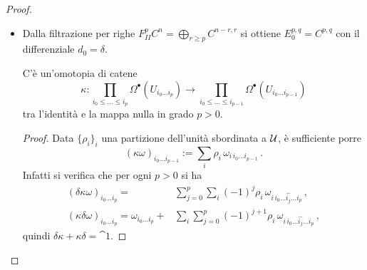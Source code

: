 \begin{ex!}
\begin{thm}
\begin{proof}
\begin{itemize}
\begin{equation*}
				= \prod_{i_{0} \le \dots \le i_{p}} H_{\mathrm{dR}}^{q}(U_{i_{0} \dots i_{p}})
				= \begin{cases}
					\R\,, \quad &\text{se } q = 0\,; \\
					0\,, \quad &\text{altrimenti},
				\end{cases}
				\end{equation*}
				dove l'ultima uguaglianza segue dall'ipotesi di $\Uu$ buon ricoprimento.
				Si noti in particolare che
				\begin{equation*}
					H^{0}_{\mathrm{dR}}(U_{i_{0} \dots i_{p}}) 
					= \R
					= \underline{\R}(U_{i_{0} \dots i_{p}})
				\end{equation*}
				è dotato del differenziale  $d_{1}=\delta$. Dato che la successione
				collassa alla seconda pagina, 
				il limite è $E_{\infty}^{p,q} = E_{2}^{p,q}$,
				quindi si conclude che
				\begin{equation*}
				 	H^{*}(T^{bullet}) = \check{H}^{*}(M;\Uu)\,.
				 \end{equation*}
				
				\item Dalla filtrazione per righe 
				$F_{II}^{p}C^{n}=\bigoplus_{r \ge p} C^{n-r,r}$
				si ottiene $E_{0}^{p,q} = C^{p,q}$ con il differenziale $d_{0}=\delta$.
				
				\begin{lemma}
					C'è un'omotopia di catene
					\begin{equation*}
						\kappa : \prod_{i_{0} \le \dots \le i_{p}} \Omega^{\bullet} (U_{i_{0} \dots i_{p}})
						\longrightarrow \prod_{i_{0} \le \dots \le i_{p-1}} \Omega^{\bullet} (U_{i_{0} \dots i_{p-1}})
					\end{equation*}
					tra l'identità e la mappa nulla in grado $p > 0$.
					\begin{proof}
						Data $\{\rho_{i}\}_{i}$ una partizione dell'unità
						sbordinata a $\Uu$, 
						è sufficiente porre
						\begin{equation*}
							(\kappa \omega)_{i_{0} \dots i_{p-1}} 
							:= \sum_{i} \rho_{i} \, \omega_{i\,i_{0} \dots i_{p-1}}\,.
						\end{equation*}
						Infatti si verifica che per ogni $p > 0$ si ha
						\begin{align*}
							(\delta \kappa \omega)_{i_{0} \dots i_{p}}
							=& \sum_{j = 0}^{p} \sum_{i} (-1)^{j} \rho_{i} \, \omega_{i\,i_{0} \dots \hat{i_{j}} \dots i_{p}}\,, \\
							(\kappa \delta \omega)_{i_{0} \dots i_{p}}
							= \omega_{i_{0} \dots i_{p}} +& \sum_{i} \sum_{j = 0}^{p} (-1)^{j+1} \rho_{i} \, \omega_{i\,i_{0} \dots \hat{i_{j}} \dots i_{p}}\,,
						\end{align*}
						quindi $\delta \kappa + \kappa \delta = \cat{1}$.
					\end{proof}
				\end{lemma}
				

\end{itemize}
\end{proof}
\end{thm}
\end{ex!}
